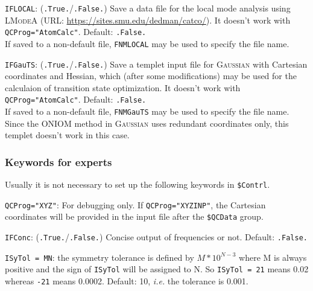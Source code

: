 \documentclass[12pt,english]{extarticle}
\begin{document}
\bigskip{}\bigskip{}
\verb|IFLOCAL|: (\verb|.True.|/\verb|.False.|) Save a data file for the local mode analysis using \textsc{LModeA} (URL: \href{https://sites.smu.edu/dedman/catco/}{https://sites.smu.edu/dedman/catco/}). It doesn't work with \verb|QCProg="AtomCalc"|.
Default: \verb|.False.|  \\
If saved to a non-default file, \verb|FNMLOCAL| may be used to specify the file name.

\bigskip{}\bigskip{}
\verb|IFGauTS|: (\verb|.True.|/\verb|.False.|) Save a templet input file for \textsc{Gaussian} with Cartesian coordinates and Hessian, which (after some modifications) may be used for the calculaion of transition state optimization. It doesn't work with \verb|QCProg="AtomCalc"|.
Default: \verb|.False.|  \\
If saved to a non-default file, \verb|FNMGauTS| may be used to specify the file name. \\
Since the ONIOM method in \textsc{Gaussian} uses redundant coordinates only, this templet doesn't work in this case.

\subsubsection{Keywords for experts} \label{subsec:inp-qcdata-expert}

Usually it is not necessary to set up the following keywords in \texttt{\$Contrl}.

\bigskip{}\bigskip{}
\verb|QCProg="XYZ"|: For debugging only. If \verb|QCProg="XYZINP"|, the Cartesian coordinates will be provided in the input file after the \texttt{\$QCData} group.

\bigskip{}\bigskip{}
\verb|IFConc|: (\verb|.True.|/\verb|.False.|) Concise output of frequencies or not. Default: \verb|.False.|

\bigskip{}\bigskip{}
\verb|ISyTol = MN|: the symmetry tolerance is defined by $M*10^{N-3}$ where M
is always positive and the sign of \verb|ISyTol| will be assigned to N. So
\verb|ISyTol = 21| means 0.02 whereas \verb|-21| means 0.0002. Default: 10, \emph{i.e.} the tolerance is 0.001.
\end{document}
